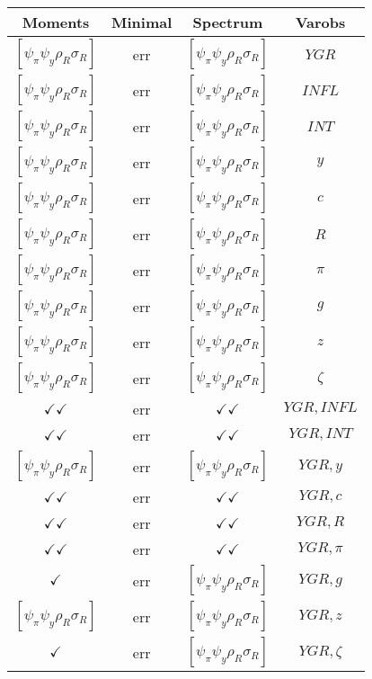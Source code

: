 \documentclass[a4paper,10pt]{article}
\begin{document}
\centering
\begin{longtable}{|c|c|c|c|}
\hline
Moments & Minimal & Spectrum & Varobs \\
\hline
$[\psi_\pi \psi_y \rho_R \sigma_R ]$ & err & $[\psi_\pi \psi_y \rho_R \sigma_R ]$ & ${YGR}$ \\
\hline
$[\psi_\pi \psi_y \rho_R \sigma_R ]$ & err & $[\psi_\pi \psi_y \rho_R \sigma_R ]$ & ${INFL}$ \\
\hline
$[\psi_\pi \psi_y \rho_R \sigma_R ]$ & err & $[\psi_\pi \psi_y \rho_R \sigma_R ]$ & ${INT}$ \\
\hline
$[\psi_\pi \psi_y \rho_R \sigma_R ]$ & err & $[\psi_\pi \psi_y \rho_R \sigma_R ]$ & ${y}$ \\
\hline
$[\psi_\pi \psi_y \rho_R \sigma_R ]$ & err & $[\psi_\pi \psi_y \rho_R \sigma_R ]$ & ${c}$ \\
\hline
$[\psi_\pi \psi_y \rho_R \sigma_R ]$ & err & $[\psi_\pi \psi_y \rho_R \sigma_R ]$ & ${R}$ \\
\hline
$[\psi_\pi \psi_y \rho_R \sigma_R ]$ & err & $[\psi_\pi \psi_y \rho_R \sigma_R ]$ & ${\pi}$ \\
\hline
$[\psi_\pi \psi_y \rho_R \sigma_R ]$ & err & $[\psi_\pi \psi_y \rho_R \sigma_R ]$ & ${g}$ \\
\hline
$[\psi_\pi \psi_y \rho_R \sigma_R ]$ & err & $[\psi_\pi \psi_y \rho_R \sigma_R ]$ & ${z}$ \\
\hline
$[\psi_\pi \psi_y \rho_R \sigma_R ]$ & err & $[\psi_\pi \psi_y \rho_R \sigma_R ]$ & ${\zeta}$ \\
\hline
$\checkmark\checkmark$ & err & $\checkmark\checkmark$ & ${YGR},{INFL}$ \\
\hline
$\checkmark\checkmark$ & err & $\checkmark\checkmark$ & ${YGR},{INT}$ \\
\hline
$[\psi_\pi \psi_y \rho_R \sigma_R ]$ & err & $[\psi_\pi \psi_y \rho_R \sigma_R ]$ & ${YGR},{y}$ \\
\hline
$\checkmark\checkmark$ & err & $\checkmark\checkmark$ & ${YGR},{c}$ \\
\hline
$\checkmark\checkmark$ & err & $\checkmark\checkmark$ & ${YGR},{R}$ \\
\hline
$\checkmark\checkmark$ & err & $\checkmark\checkmark$ & ${YGR},{\pi}$ \\
\hline
$\checkmark$ & err & $[\psi_\pi \psi_y \rho_R \sigma_R ]$ & ${YGR},{g}$ \\
\hline
$[\psi_\pi \psi_y \rho_R \sigma_R ]$ & err & $[\psi_\pi \psi_y \rho_R \sigma_R ]$ & ${YGR},{z}$ \\
\hline
$\checkmark$ & err & $[\psi_\pi \psi_y \rho_R \sigma_R ]$ & ${YGR},{\zeta}$ \\

\end{longtable}
\end{document}
